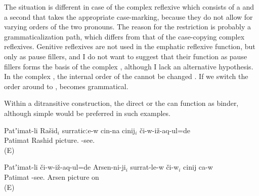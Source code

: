 The situation is different in case of the complex  reflexive which consists of a   and a second  that takes the appropriate case-marking, because they do not allow for varying orders of the two pronouns. The reason for the restriction is probably a grammaticalization path, which differs from that of the case-copying complex reflexives. Genitive reflexives are not used in the emphatic reflexive function, but only as pause fillers, and I do not want to suggest that their function as pause fillers forms the basis of the complex , although I lack an alternative hypothesis. In the complex  , the internal order of the   cannot be changed . If we switch the order around to ,  becomes grammatical.
%
\begin{exe}
\end{exe}

Within a ditransitive construction, the direct  or the   can function as binder, although simple  would be preferred in such examples.
%
\begin{exe}
		\ex	\label{ex:Patimat showed Rashid to himself on the picture@12a}
		\gll	Patʼimat-li	Rašid$_{i}$	surraticːe-w	cin-na	cinij$_{i}$	či-w-iž-aq-ul=de\\
			Patimat	Rashid	picture.			-see.\\
		\glt	{} (E)

		\ex	\label{ex:Patimat showed to Arsen himself on the picture@12b}
		\gll	Patʼimat-li	či-w-iž-aq-ul=de	Arsen-ni-ji$_{i}$	surrat-le-w	či-w$_{i}$	cinij	ca-w\\
			Patimat	-see.	Arsen	picture	on		  \\
		\glt	{} (E)

\end{exe}

